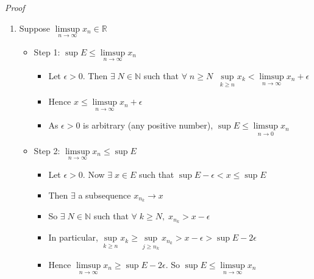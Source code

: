 \documentclass[12pt]{article}
\begin{document}
{\sl Proof}
\begin{enumerate}[label=(\roman*)]
    \item Suppose $\limsup\limits_{n\to\infty} x_n\in\mathbb{R}$
    \begin{itemize}
        \item Step 1: $\sup E\le \limsup\limits_{n\to\infty} x_n$
            \begin{itemize}
                \item Let $\epsilon >0$. Then $\exists\;N\in\mathbb{N}$ such that $\forall\; n\ge N\;\;\sup\limits_{k\ge n} x_k < \limsup\limits_{n\to\infty} x_n +\epsilon$
                
                \item Hence $x\le \limsup\limits_{n\to\infty} x_n + \epsilon$ 
                \item As $\epsilon>0$ is arbitrary (any positive number), $\sup E\le \limsup\limits_{n\to 0} x_n$
            \end{itemize}
       
        \item Step 2: $\limsup\limits_{n\to\infty} x_n \le \sup E$
            \begin{itemize}
                \item Let $\epsilon >0.$ Now $\exists\;x\in E$ such that $\sup E -\epsilon < x\le \sup E$
                \item Then $\exists$ a subsequence $x_{n_k}\to x$
                \item So $\exists\; N\in\mathbb{N}$ such that $\forall\; k\ge N,\; x_{n_k} >x-\epsilon$
                \item In particular, $\sup\limits_{k\ge n} x_k \ge \sup\limits_{j\ge n_k} x_{n_k} > x-\epsilon > \sup E - 2\epsilon$
                \item Hence $\limsup\limits_{n\to\infty} x_n \ge \sup E - 2\epsilon$. So $\sup E\le \limsup\limits_{n\to\infty} x_n$
            \end{itemize}
        

\end{itemize}
\end{enumerate}
\end{document}
